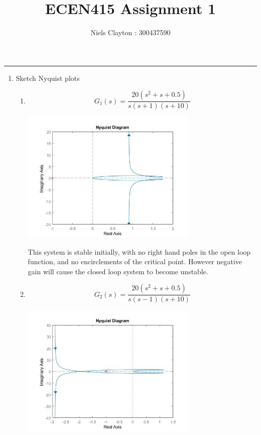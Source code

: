 \documentclass[a4paper,11pt]{article}
\begin{document}
\begin{preview}
\title{\LARGE{\textbf{ECEN415 Assignment 1}}}
\author{Niels Clayton : 300437590}
\date{}
\maketitle
\hrule

\begin{enumerate}
    
    \item Sketch Nyquist plots

    \begin{enumerate}
      \item $$ G_1 (s) = \frac{20(s^2+s+0.5)}{s(s+1)(s+10)} $$
      
      \begin{center}
        \includegraphics[width=0.7\textwidth]{A_1/1_a.jpg}
      \end{center}

      This system is stable initially, with no right hand poles in the open loop function, and no encirclements of the critical point. However negative gain will cause the closed loop system to become unstable.\\
      

      \item $$ G_2 (s) = \frac{20(s^2+s+0.5)}{s(s-1)(s+10)} $$

      \begin{center}
        \includegraphics[width=0.7\textwidth]{A_1/1_b.jpg}
      \end{center}


\end{enumerate}
\end{enumerate}
\end{preview}
\end{document}
